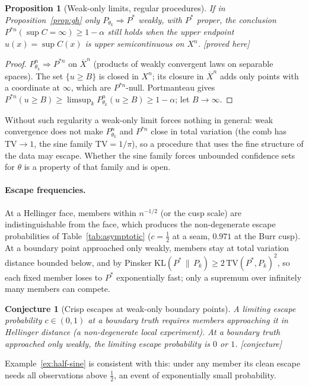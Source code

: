 \documentclass[11pt]{article}
\newcommand{\bX}{\overline{X}}
\newcommand{\status}[1]{\textsf{[#1]}}
\newtheorem{proposition}[theorem]{Proposition}
\newtheorem{conjecture}[theorem]{Conjecture}
\theoremstyle{definition}
\theoremstyle{remark}
\begin{document}
\begin{proposition}[Weak-only limits, regular procedures]\label{prop:gh-weak}
If in Proposition~\ref{prop:gh} only $P_{\theta_k}\Rightarrow P^*$ weakly,
with $P^*$ proper, the conclusion $P^{*n}(\sup C=\infty)\ge1-\alpha$ still
holds when the upper endpoint $u(x)=\sup C(x)$ is upper semicontinuous on
$X^n$. \status{proved here}
\end{proposition}
\begin{proof}
$P^n_{\theta_k}\Rightarrow P^{*n}$ on $\bX^n$ (products of weakly convergent
laws on separable spaces). The set $\{u\ge B\}$ is closed in $X^n$; its
closure in $\bX^n$ adds only points with a coordinate at $\infty$, which
are $P^{*n}$-null. Portmanteau gives
$P^{*n}(u\ge B)\ge\limsup_kP^n_{\theta_k}(u\ge B)\ge1-\alpha$; let
$B\to\infty$.
\end{proof}
Without such regularity a weak-only limit forces nothing in general:
weak convergence does not make $P^n_{\theta_k}$ and $P^{*n}$ close in total
variation (the comb has $\mathrm{TV}\to1$, the sine family
$\mathrm{TV}=1/\pi$), so a procedure that uses the fine structure of the data
may escape. Whether the sine family forces unbounded confidence sets for
$\theta$ is a property of that family and is open.

\paragraph{Escape frequencies.} At a Hellinger face, members within
$n^{-1/2}$ (or the cusp scale) are indistinguishable from the face, which
produces the non-degenerate escape probabilities of
Table~\ref{tab:asymptotic} ($c=\frac12$ at a seam, $0.971$ at the Burr
cusp). At a boundary point approached only weakly, members stay at total
variation distance bounded below, and by Pinsker
$\mathrm{KL}(P^*\,\|\,P_k)\ge2\,\mathrm{TV}(P^*,P_k)^2$, so each fixed member loses
to $P^*$ exponentially fast; only a supremum over infinitely many members
can compete.

\begin{conjecture}[Crisp escapes at weak-only boundary points]
\label{conj:crisp}
A limiting escape probability $c\in(0,1)$ at a boundary truth requires
members approaching it in Hellinger distance (a non-degenerate local
experiment). At a boundary truth approached only weakly, the limiting
escape probability is $0$ or $1$. \status{conjecture}
\end{conjecture}
Example~\ref{ex:half-sine} is consistent with this: under any member its
clean escape needs all observations above $\frac12$, an event of
exponentially small probability.
\end{document}
